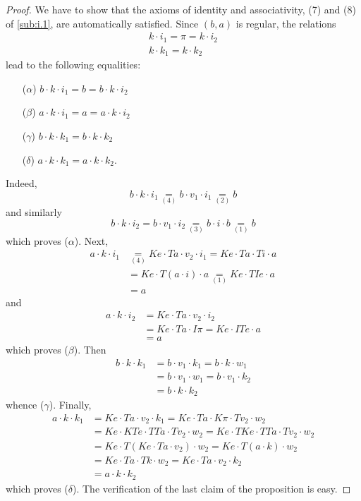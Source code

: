 \documentclass{article}
\newcommand{\oldpage}[1]{\marginpar{\footnotesize$\Big\vert$ \textit{p.~#1}}}
\begin{document}
\begin{proof}
  We have to show that the axioms of identity and associativity, (7) and (8) of \cref{sub:i.1}, are automatically satisfied.
  Since $(b,a)$ is regular, the relations
  \[
    \begin{gathered}
      k\cdot i_1
      = \pi
      = k\cdot i_2
    \\k\cdot k_1
      = k\cdot k_2
    \end{gathered}
  \]
  lead to the following equalities:
  \begin{enumerate}
    \item[($\alpha$)] $b\cdot k\cdot i_1=b=b\cdot k\cdot i_2$
    \item[($\beta$)] $a\cdot k\cdot i_1=a=a\cdot k\cdot i_2$
    \item[($\gamma$)] $b\cdot k\cdot k_1=b\cdot k\cdot k_2$
    \item[($\delta$)] $a\cdot k\cdot k_1=a\cdot k\cdot k_2$.
  \end{enumerate}
  Indeed,
  \oldpage{230}
  \[
    b\cdot k\cdot i_1
    \underset{(4)}{=} b\cdot v_1\cdot i_1
    \underset{(2)}{=} b
  \]
  and similarly
  \[
    b\cdot k\cdot i_2
    = b\cdot v_1\cdot i_2
    \underset{(3)}{=} b\cdot i\cdot b
    \underset{(1)}{=} b
  \]
  which proves ($\alpha$).
  Next,
  \[
    \begin{aligned}
      a\cdot k\cdot i_1
      &\underset{(4)}{=} Ke\cdot Ta\cdot v_2\cdot i_1
      = Ke\cdot Ta\cdot Ti\cdot a
    \\&= Ke\cdot T(a\cdot i)\cdot a
      \underset{(1)}{=} Ke\cdot TIe\cdot a
    \\&= a
    \end{aligned}
  \]
  and
  \[
    \begin{aligned}
      a\cdot k\cdot i_2
      &= Ke\cdot Ta\cdot v_2\cdot i_2
    \\&= Ke\cdot Ta\cdot I\pi
      =Ke\cdot ITe\cdot a
    \\&= a
    \end{aligned}
  \]
  which proves ($\beta$).
  Then
  \[
    \begin{aligned}
      b\cdot k\cdot k_1
      &= b\cdot v_1\cdot k_1
      = b\cdot k\cdot w_1
    \\&= b\cdot v_1\cdot w_1
      = b\cdot v_1\cdot k_2
    \\&= b\cdot k\cdot k_2
    \end{aligned}
  \]
  whence ($\gamma$).
  Finally,
  \[
    \begin{aligned}
      a\cdot k\cdot k_1
      &= Ke\cdot Ta\cdot v_2\cdot k_1
      = Ke\cdot Ta\cdot K\pi\cdot Tv_2\cdot w_2
    \\&= Ke\cdot KTe\cdot TTa\cdot Tv_2\cdot w_2
      = Ke\cdot TKe\cdot TTa\cdot Tv_2\cdot w_2
    \\&= Ke\cdot T(Ke\cdot Ta\cdot v_2)\cdot w_2
      = Ke\cdot T(a\cdot k)\cdot w_2
    \\&= Ke\cdot Ta\cdot Tk\cdot w_2
      = Ke\cdot Ta\cdot v_2\cdot k_2
    \\&= a\cdot k\cdot k_2
    \end{aligned}
  \]
  which proves ($\delta$).
  The verification of the last claim of the proposition is easy.
\end{proof}
\end{document}
